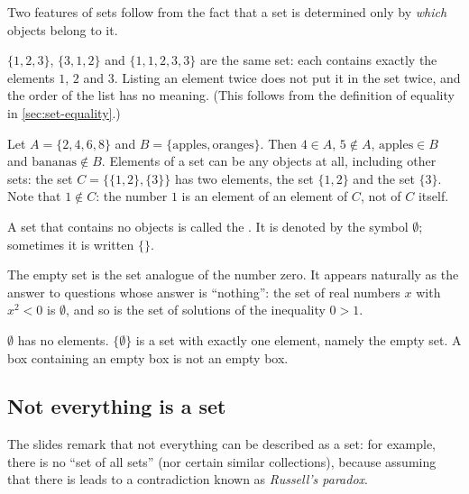 Two features of sets follow from the fact that a set is determined only by \emph{which} objects belong
to it.

\begin{note}
$\{1,2,3\}$, $\{3,1,2\}$ and $\{1,1,2,3,3\}$ are the same set: each contains exactly the elements $1$, $2$
and $3$. Listing an element twice does not put it in the set twice, and the order of the list has no
meaning. (This follows from the definition of equality in \cref{sec:set-equality}.)
\end{note}

\begin{example}[Membership]
Let $A=\{2,4,6,8\}$ and $B=\{\text{apples},\text{oranges}\}$. Then $4\in A$, $5\notin A$,
$\text{apples}\in B$ and $\text{bananas}\notin B$. Elements of a set can be any objects at all, including
other sets: the set $C=\{\{1,2\},\{3\}\}$ has two elements, the set $\{1,2\}$ and the set $\{3\}$. Note
that $1\notin C$: the number $1$ is an element of an element of $C$, not of $C$ itself.
\end{example}

\begin{definition}
A set that contains no objects is called the . It is denoted by the symbol $\emptyset$;
sometimes it is written $\{\}$. 
\end{definition}

The empty set is the set analogue of the number zero. It appears naturally as the answer to questions
whose answer is ``nothing'': the set of real numbers $x$ with $x^2<0$ is $\emptyset$, and so is the set of
solutions of the inequality $0>1$.

\begin{warning}
$\emptyset$ has no elements. $\{\emptyset\}$ is a set with exactly one element, namely the empty set. A box
containing an empty box is not an empty box.
\end{warning}

\subsection{Not everything is a set}
\begin{note}
The slides remark that not everything can be described as a set: for example, there is no ``set of all
sets'' (nor certain similar collections), because assuming that there is leads to a contradiction known
as \emph{Russell's paradox}. 
\end{note}


